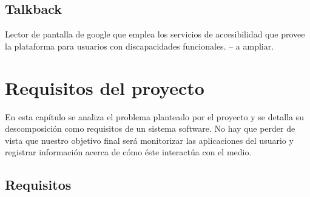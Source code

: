 \documentclass[12pt,a4paper,oneside]{book} %
\begin{document}
\section{Talkback}
Lector de pantalla de google que emplea los servicios de accesibilidad que provee la plataforma para usuarios con discapacidades funcionales. -- a ampliar. 
\chapter{Requisitos del proyecto}
En esta capítulo se analiza el problema planteado por el proyecto y se detalla su descomposición como requisitos de un sistema software. No hay que perder de vista que nuestro objetivo final será monitorizar las aplicaciones del usuario y registrar información acerca de cómo éste interactúa con el medio.
\newpage
\section{Requisitos}
\end{document}
